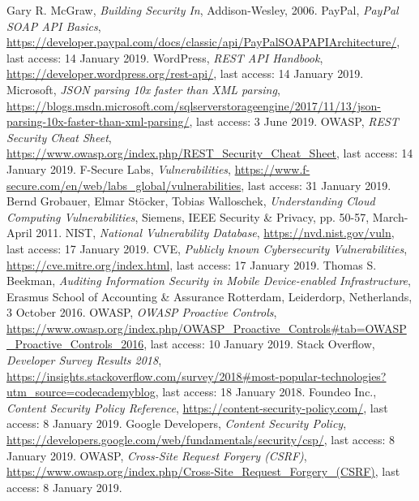\documentclass{article} %
\begin{document}
\begin{thebibliography}{9}
Gary R. McGraw, \emph{Building Security In}, Addison-Wesley, 2006.
PayPal, \emph{PayPal SOAP API Basics}, \url{https://developer.paypal.com/docs/classic/api/PayPalSOAPAPIArchitecture/}, last access: 14 January 2019.
WordPress, \emph{REST API Handbook}, \url{https://developer.wordpress.org/rest-api/}, last access: 14 January 2019.
Microsoft, \emph{JSON parsing 10x faster than XML parsing}, \url{https://blogs.msdn.microsoft.com/sqlserverstorageengine/2017/11/13/json-parsing-10x-faster-than-xml-parsing/}, last access: 3 June 2019.
OWASP, \emph{REST Security Cheat Sheet}, \url{https://www.owasp.org/index.php/REST_Security_Cheat_Sheet}, last access: 14 January 2019.
F-Secure Labs, \emph{Vulnerabilities}, \url{https://www.f-secure.com/en/web/labs_global/vulnerabilities}, last access: 31 January 2019.
Bernd Grobauer, Elmar Stöcker, Tobias Walloschek, \emph{Understanding Cloud Computing Vulnerabilities}, Siemens, IEEE Security \& Privacy, pp. 50-57, March-April 2011.
NIST, \emph{National Vulnerability Database}, \url{https://nvd.nist.gov/vuln}, last access: 17 January 2019.
CVE, \emph{Publicly known Cybersecurity Vulnerabilities}, \url{https://cve.mitre.org/index.html}, last access: 17 January 2019.
Thomas S. Beekman, \emph{Auditing Information Security in Mobile Device-enabled Infrastructure}, Erasmus School of Accounting \& Assurance Rotterdam, Leiderdorp, Netherlands, 3 October 2016.
OWASP, \emph{OWASP Proactive Controls}, \url{https://www.owasp.org/index.php/OWASP_Proactive_Controls#tab=OWASP_Proactive_Controls_2016}, last access: 10 January 2019.
Stack Overflow, \emph{Developer Survey Results 2018}, \url{https://insights.stackoverflow.com/survey/2018#most-popular-technologies?utm_source=codecademyblog}, last access: 18 January 2018.
Foundeo Inc., \emph{Content Security Policy Reference}, \url{https://content-security-policy.com/}, last access: 8 January 2019.
Google Developers, \emph{Content Security Policy}, \url{https://developers.google.com/web/fundamentals/security/csp/}, last access: 8 January 2019.
OWASP, \emph{Cross-Site Request Forgery (CSRF)}, \url{https://www.owasp.org/index.php/Cross-Site_Request_Forgery_(CSRF)}, last access: 8 January 2019.

\end{thebibliography}
\end{document}
